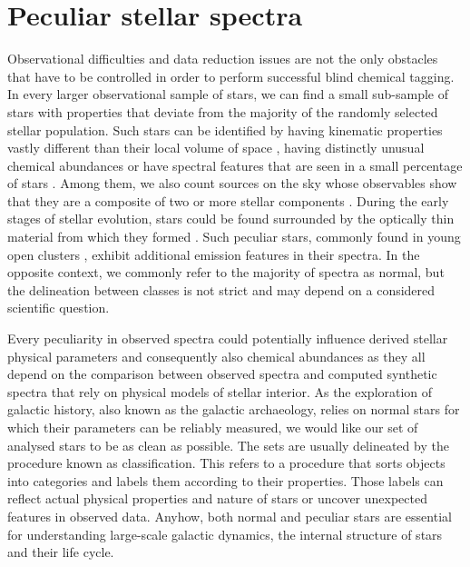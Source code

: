 \section{Peculiar stellar spectra}
Observational difficulties and data reduction issues are not the only obstacles that have to be controlled in order to perform successful blind chemical tagging. In every larger observational sample of stars, we can find a small sub-sample of stars with properties that deviate from the majority of the randomly selected stellar population. Such stars can be identified by having kinematic properties vastly different than their local volume of space \cite{2010MNRAS.407.2241K, 2011ApJ...728..102W, 2017arXiv171003763C}, having distinctly unusual chemical abundances \cite{1974ARA&A..12..257P} or have spectral features that are seen in a small percentage of stars \cite{2010AJ....140.1758T, 2017ApJS..228...24T}. Among them, we also count sources on the sky whose observables show that they are a composite of two or more stellar components \cite{2010AJ....140..184M, 2018MNRAS.473.5043E, 2018MNRAS.476..528E}. During the early stages of stellar evolution, stars could be found surrounded by the optically thin material from which they formed \cite{2007prpl.conf..361A}. Such peculiar stars, commonly found in young open clusters \cite{2012AJ....143...61N, 2015A&A...581A..52T}, exhibit additional emission features in their spectra. In the opposite context, we commonly refer to the majority of spectra as normal, but the delineation between classes is not strict and may depend on a considered scientific question.

Every peculiarity in observed spectra could potentially influence derived stellar physical parameters and consequently also chemical abundances as they all depend on the comparison between observed spectra and computed synthetic spectra that rely on physical models of stellar interior. As the exploration of galactic history, also known as the galactic archaeology, relies on normal stars for which their parameters can be reliably measured, we would like our set of analysed stars to be as clean as possible. The sets are usually delineated by the procedure known as classification. This refers to a procedure that sorts objects into categories and labels them according to their properties. Those labels can reflect actual physical properties and nature of stars or uncover unexpected features in observed data. Anyhow, both normal and peculiar stars are essential for understanding large-scale galactic dynamics, the internal structure of stars and their life cycle.

